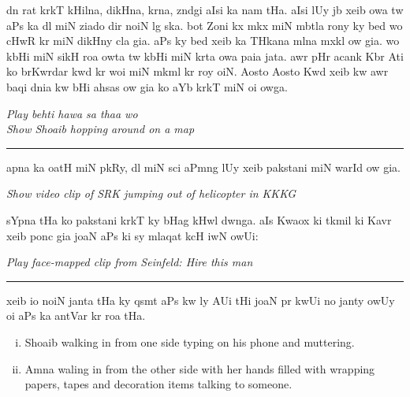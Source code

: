 \documentclass{article}
\begin{document}
	dn rat krkT kHilna, dikHna,  krna, zndgi aIsi ka nam tHa.
	aIsi lUy jb xeib  owa tw aPs ka dl  miN ziado dir noiN lg ska.
	bot Zoni kx mkx miN mbtla rony ky bed wo  cHwR kr  miN  dikHny cla gia.
	aPs ky bed xeib ka THkana mlna mxkl ow gia.
	wo kbHi  miN  sikH roa owta tw kbHi  miN  krta owa paia jata.
	awr pHr acank Kbr Ati ko brKwrdar  kwd kr woi  miN mkml kr roy oiN. 
	Aosto Aosto Kwd xeib kw awr baqi dnia kw bHi ahsas ow gia ko aYb  krkT miN oi owga.

\begin{enpara}
	\itshape
	Play behti hawa sa thaa wo\\
	Show Shoaib hopping around on a map
\end{enpara}

\rule{\textwidth}{1pt}

	apna  ka  oatH miN pkRy, dl miN sci aPmng lUy xeib pakstani miN warId ow gia.

\begin{enpara}
	\itshape
	Show video clip of SRK jumping out of helicopter in KKKG
\end{enpara}
\vspace{0.5\baselineskip}

	sYpna tHa ko pakstani krkT ky bHag kHwl dwnga.
	aIs Kwaox ki tkmil ki Kavr xeib  ponc gia joaN aPs ki  sy mlaqat kcH iwN owUi: 

\begin{enpara}
	\itshape
	Play face-mapped clip from Seinfeld: Hire this man
\end{enpara}



\rule{\textwidth}{1pt}

	xeib io noiN janta tHa ky qsmt aPs kw  ly AUi tHi joaN pr kwUi no janty owUy oi aPs ka antVar kr roa tHa.

\begin{enpara}
	\begin{enumerate}[(i)]
		\item Shoaib walking in from one side typing on his phone and muttering.
		\item Amna waling in from the other side with her hands filled with wrapping papers, tapes and decoration items talking to someone.
	\end{enumerate}
\end{enpara}
\end{document}
